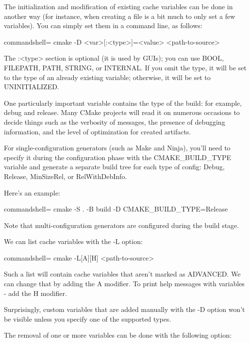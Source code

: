 The initialization and modification of existing cache variables can be done in another way (for instance, when creating a file is a bit much to only set a few variables). You can simply set them in a command line, as follows:

\begin{tcblisting}{commandshell={}}
cmake -D <var>[:<type>]=<value> <path-to-source>
\end{tcblisting}

The :<type> section is optional (it is used by GUIs); you can use BOOL, FILEPATH, PATH, STRING, or INTERNAL. If you omit the type, it will be set to the type of an already existing variable; otherwise, it will be set to UNINITIALIZED.

One particularly important variable contains the type of the build: for example, debug and release. Many CMake projects will read it on numerous occasions to decide things such as the verbosity of messages, the presence of debugging information, and the level of optimization for created artifacts.

For single-configuration generators (such as Make and Ninja), you'll need to specify it during the configuration phase with the CMAKE\_BUILD\_TYPE variable and generate a separate build tree for each type of config: Debug, Release, MinSizeRel, or RelWithDebInfo.

Here's an example:

\begin{tcblisting}{commandshell={}}
cmake -S . -B build -D CMAKE_BUILD_TYPE=Release
\end{tcblisting}

Note that multi-configuration generators are configured during the build stage.

We can list cache variables with the -L option:

\begin{tcblisting}{commandshell={}}
cmake -L[A][H] <path-to-source>
\end{tcblisting}

Such a list will contain cache variables that aren't marked as ADVANCED. We can change that by adding the A modifier. To print help messages with variables - add the H modifier.

Surprisingly, custom variables that are added manually with the -D option won't be visible unless you specify one of the supported types.

The removal of one or more variables can be done with the following option:

